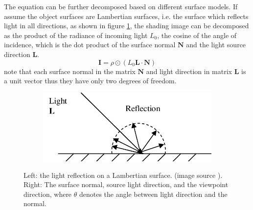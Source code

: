 The equation can be further decomposed based on different surface models. If assume the object surfaces are Lambertian surfaces, i.e. the surface which reflects light in all directions, as shown in figure \ref{fig:lambertian-surface}, the shading image can be decomposed as the product of the radiance of incoming light $ L_0 $, the cosine of the angle of incidence, which is the dot product of the surface normal $ \textbf{N} $ and the light source direction $ \textbf{L} $.
\[ \textbf{I} = \rho \odot ( L_0 \textbf{L} \cdot \textbf{N}) \]
note that each surface normal in the matrix $ \textbf{N} $ and light direction in matrix $ \textbf{L} $ is a unit vector thus they have only two degrees of freedom. 

\begin{figure}[th]
	\centering
	\begin{subfigure}[b]{0.48\linewidth}
		\includegraphics[width=\textwidth]{./Figures/Lambertian-Reflection-Lambertian-Surface.png}
	\end{subfigure}
	\begin{subfigure}[b]{0.48\linewidth}
	\end{subfigure}
	\decoRule
	\caption{Left: the light reflection on a Lambertian surface. (image source \cite{lambertian-reflectance}). Right: The surface normal, source light direction, and the viewpoint direction, where $ \theta $ denotes the angle between light direction and the normal.}
	\label{fig:lambertian-surface}
\end{figure}

